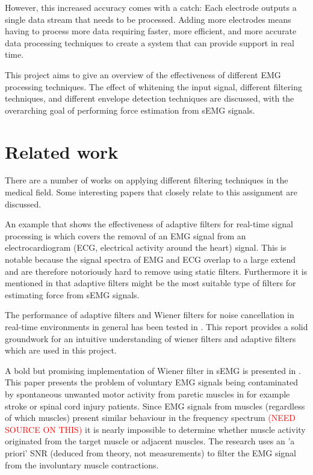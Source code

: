 However, this increased accuracy comes with a catch: Each electrode outputs a single data stream that needs to be processed. Adding more electrodes means having to process more data requiring faster, more efficient, and more accurate data processing techniques to create a system that can provide support in real time.

This project aims to give an overview of the effectiveness of different EMG processing techniques. The effect of whitening the input signal, different filtering techniques, and different envelope detection techniques are discussed, with the overarching goal of performing force estimation from sEMG signals.

\section{Related work}
There are a number of works on applying different filtering techniques in the medical field. Some interesting papers that closely relate to this assignment are discussed.

An example that shows the effectiveness of adaptive filters for real-time signal processing is \cite{adaptive_filter_emg_noise_cancellation_ecg} which covers the removal of an EMG signal from an electrocardiogram (ECG, electrical activity around the heart) signal. This is notable because the signal spectra of EMG and ECG overlap to a large extend and are therefore notoriously hard to remove using static filters. Furthermore it is mentioned in \cite{influence_semg_amplitude_estimation_technique_on_emg_force_relationship} that adaptive filters might be the most suitable type of filters for estimating force from sEMG signals.

The performance of adaptive filters and Wiener filters for noise cancellation in real-time environments in general has been tested in \cite{wiener_vs_adaptive_realtime_noisecancellation}. This report provides a solid groundwork for an intuitive understanding of wiener filters and adaptive filters which are used in this project.

A bold but promising implementation of Wiener filter in sEMG is presented in \cite{wiener_filter_a_priori_semg}. This paper presents the problem of voluntary EMG signals being contaminated by spontaneous unwanted motor activity from paretic muscles in for example stroke or spinal cord injury patients. Since EMG signals from muscles (regardless of which muscles) present similar behaviour in the frequency spectrum \textcolor{red}{(NEED SOURCE ON THIS)} it is nearly impossible to determine whether muscle activity originated from the target muscle or adjacent muscles. The research uses an 'a priori' SNR (deduced from theory, not measurements) to filter the EMG signal from the involuntary muscle contractions. 



